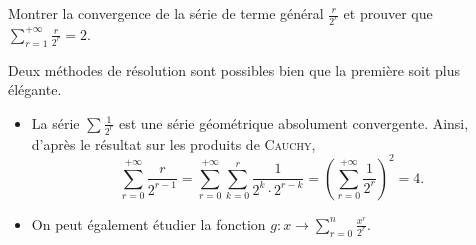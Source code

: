 \begin{exercice}
    Montrer la convergence de la série de terme général $\frac{r}{2^r}$ et prouver que $\sum\limits_{r=1}^{+ \infty} \frac{r}{2^r} = 2$. 
\end{exercice}


\begin{elem_sol}
    Deux méthodes de résolution sont possibles bien que la première soit plus élégante. 
    \begin{itemize}
        \item La série $\sum \frac{1}{2^r}$ est une série géométrique absolument convergente. Ainsi, d'après le résultat sur les produits de \textsc{Cauchy}, 
        $$\sum_{r=0}^{+ \infty} \frac{r}{2^{r-1}} = \sum_{r=0}^{+ \infty} \sum_{k=0}^{r} \frac{1}{2^k \cdot 2^{r-k}} = \left( \sum_{r=0}^{+ \infty} \frac{1}{2^r} \right)^2 = 4.$$
        \item On peut également étudier la fonction $g : x \to \sum\limits_{r=0}^{n} \frac{x^r}{2^r}$.
    \end{itemize}
\end{elem_sol}
